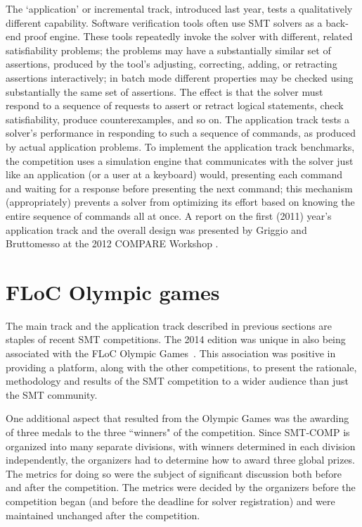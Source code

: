 \documentclass[twosize,11pt]{article}
\begin{document}
The `application' or incremental track, introduced last year, tests a qualitatively different capability. Software verification tools often use SMT solvers as a back-end proof engine. These tools repeatedly invoke the solver with different, related satisfiability problems; the problems may have a substantially similar set of assertions, produced by the tool's adjusting, correcting, adding, or retracting assertions interactively; in batch mode different properties may be checked using substantially the same set of assertions.
The effect is that the solver must respond to a sequence of requests to assert or retract logical statements, check satisfiability, produce counterexamples, and so on. The application track tests a solver's performance in responding to such a sequence of commands, as produced by actual application problems. To implement the application track benchmarks, the 
competition uses a simulation engine that communicates with the solver just like an application (or a user at a keyboard) would, presenting each command and waiting for a response before presenting the next command; this mechanism (appropriately) prevents a solver from optimizing its effort based on knowing the entire sequence of commands all at once. A report
on the first (2011) year's application track and the overall design was presented by Griggio and Bruttomesso at the 
2012 COMPARE Workshop \cite{ag+rb+12}.


\section{FLoC Olympic games}
\label{sec:floc}

The main track and the application track described in previous sections are staples of recent SMT competitions. The 2014 edition was unique in also being associated with the FLoC Olympic Games~\cite{TBD}.
This association was positive in providing a platform, along with the other competitions, to present the
rationale, methodology and results of the SMT competition to a wider audience than just the SMT community.

One additional aspect that resulted from the Olympic Games was the awarding of three medals to the three ``winners" of the competition. Since SMT-COMP is organized into many separate divisions, with winners determined in each division independently, the organizers had to determine how to award three global prizes.
The metrics for doing so were the subject of significant discussion both before and after the competition.
The metrics were decided by the organizers before the competition began (and before the deadline for solver registration) and were maintained unchanged after the competition.
\end{document}
